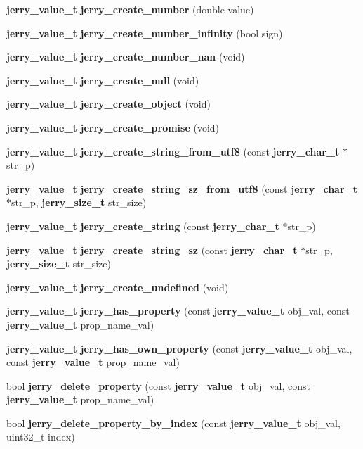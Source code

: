\begin{DoxyCompactItemize}
\item 
\textbf{ jerry\+\_\+value\+\_\+t} {\bfseries jerry\+\_\+create\+\_\+number} (double value)
\item 
\textbf{ jerry\+\_\+value\+\_\+t} {\bfseries jerry\+\_\+create\+\_\+number\+\_\+infinity} (bool sign)
\item 
\textbf{ jerry\+\_\+value\+\_\+t} {\bfseries jerry\+\_\+create\+\_\+number\+\_\+nan} (void)
\item 
\textbf{ jerry\+\_\+value\+\_\+t} {\bfseries jerry\+\_\+create\+\_\+null} (void)
\item 
\textbf{ jerry\+\_\+value\+\_\+t} {\bfseries jerry\+\_\+create\+\_\+object} (void)
\item 
\textbf{ jerry\+\_\+value\+\_\+t} {\bfseries jerry\+\_\+create\+\_\+promise} (void)
\item 
\textbf{ jerry\+\_\+value\+\_\+t} {\bfseries jerry\+\_\+create\+\_\+string\+\_\+from\+\_\+utf8} (const \textbf{ jerry\+\_\+char\+\_\+t} $\ast$str\+\_\+p)
\item 
\textbf{ jerry\+\_\+value\+\_\+t} {\bfseries jerry\+\_\+create\+\_\+string\+\_\+sz\+\_\+from\+\_\+utf8} (const \textbf{ jerry\+\_\+char\+\_\+t} $\ast$str\+\_\+p, \textbf{ jerry\+\_\+size\+\_\+t} str\+\_\+size)
\item 
\textbf{ jerry\+\_\+value\+\_\+t} {\bfseries jerry\+\_\+create\+\_\+string} (const \textbf{ jerry\+\_\+char\+\_\+t} $\ast$str\+\_\+p)
\item 
\textbf{ jerry\+\_\+value\+\_\+t} {\bfseries jerry\+\_\+create\+\_\+string\+\_\+sz} (const \textbf{ jerry\+\_\+char\+\_\+t} $\ast$str\+\_\+p, \textbf{ jerry\+\_\+size\+\_\+t} str\+\_\+size)
\item 
\textbf{ jerry\+\_\+value\+\_\+t} {\bfseries jerry\+\_\+create\+\_\+undefined} (void)
\item 
\textbf{ jerry\+\_\+value\+\_\+t} \textbf{ jerry\+\_\+has\+\_\+property} (const \textbf{ jerry\+\_\+value\+\_\+t} obj\+\_\+val, const \textbf{ jerry\+\_\+value\+\_\+t} prop\+\_\+name\+\_\+val)
\item 
\textbf{ jerry\+\_\+value\+\_\+t} {\bfseries jerry\+\_\+has\+\_\+own\+\_\+property} (const \textbf{ jerry\+\_\+value\+\_\+t} obj\+\_\+val, const \textbf{ jerry\+\_\+value\+\_\+t} prop\+\_\+name\+\_\+val)
\item 
bool {\bfseries jerry\+\_\+delete\+\_\+property} (const \textbf{ jerry\+\_\+value\+\_\+t} obj\+\_\+val, const \textbf{ jerry\+\_\+value\+\_\+t} prop\+\_\+name\+\_\+val)
\item 
bool {\bfseries jerry\+\_\+delete\+\_\+property\+\_\+by\+\_\+index} (const \textbf{ jerry\+\_\+value\+\_\+t} obj\+\_\+val, uint32\+\_\+t index)

\end{DoxyCompactItemize}
